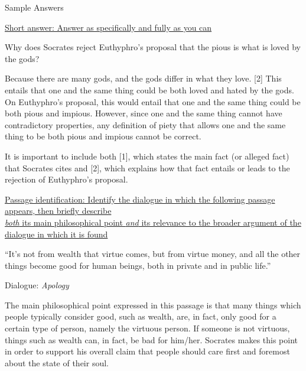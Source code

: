 \documentclass[11pt]{article}
\begin{document}
\thispagestyle{empty}
\begin{center} \LARGE{Sample Answers}\end{center}
\thispagestyle{empty}\vspace*{3mm}

\noindent\underline{Short answer: Answer as specifically and fully as you can}
\vspace*{2mm}

\noindent Why does Socrates reject Euthyphro's proposal that the pious is what is loved by the gods?
\vspace*{2mm}

\noindent [1] Because there are many gods, and the gods differ in what they love. [2] This entails that one and the same thing could be both loved and hated by the gods. On Euthyphro's proposal, this would entail that one and the same thing could be both pious and impious. However, since one and the same thing cannot have contradictory properties, any definition of piety that allows one and the same thing to be both pious and impious cannot be correct.
\vspace*{2mm}

\noindent It is important to include both [1], which states the main fact (or alleged fact) that Socrates cites and [2], which explains how that fact entails or leads to the rejection of Euthyphro's proposal.
\vspace*{4mm}

\noindent\underline{Passage identification: Identify the dialogue in which the following passage appears, then briefly describe}\\\underline{\emph{both} its main philosophical point \emph{and} its relevance to the broader argument of the dialogue in which it is found} 
\vspace*{2mm}

\noindent ``It's not from wealth that virtue comes, but from virtue money, and all the other things become good for human beings, both in private and in public life.''
\vspace*{2mm}

\noindent Dialogue: \emph{Apology}
\vspace*{2mm}

\noindent The main philosophical point expressed in this passage is that many things which people typically consider good, such as wealth, are, in fact, only good for a certain type of person, namely the virtuous person. If someone is not virtuous, things such as wealth can, in fact, be bad for him/her. Socrates makes this point in order to support his overall claim that people should care first and foremost about the state of their soul.
\end{document}
